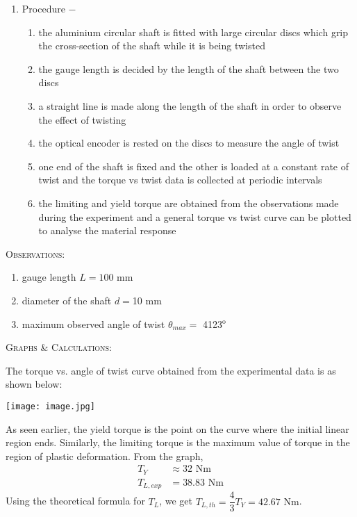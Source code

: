 \documentclass[a4paper, 11pt]{article}
\begin{document}
\begin{enumerate}[label=(\alph*)]
	\item {Procedure} $-$ 
	\begin{enumerate}[label=\roman*)]
		\item the aluminium circular shaft is fitted with large circular discs which grip the cross-section of the shaft while it is being twisted
		\item the gauge length is decided by the length of the shaft between the two discs
		\item a straight line is made along the length of the shaft in order to observe the effect of twisting
		\item the optical encoder is rested on the discs to measure the angle of twist
		\item one end of the shaft is fixed and the other is loaded at a constant rate of twist and the torque vs twist data is collected at periodic intervals
		\item the limiting and yield torque are obtained from the observations made during the experiment and a general torque vs twist curve can be plotted to analyse the material response
	\end{enumerate}
\end{enumerate}
\newpage
\textsc{Observations:}
\vspace{-2mm}

\begin{enumerate}[label=(\alph*)]
	\itemsep0em
	\item gauge length $L=100$ mm
	\item diameter of the shaft $d=$10 mm
	\item maximum observed angle of twist $\theta_{max}=$ 4123$^{\text{o}}$
\end{enumerate}

\textsc{Graphs \& Calculations:}
\vspace{2.5mm}

The torque vs. angle of twist curve obtained from the experimental data is as shown below:
\begin{center}
\texttt{[image: image.jpg]}
\end{center}
As seen earlier, the yield torque is the point on the curve where the initial linear region ends. Similarly, the limiting torque is the maximum value of torque in the region of plastic deformation. From the graph,
\begin{align*}
T_Y&\approx 32\text{ Nm}\\
T_{L,exp}&=38.83\text{ Nm}
\end{align*}
Using the theoretical formula for $T_L$, we get
$T_{L,th}=\dfrac{4}{3}T_Y=42.67\text{ Nm}$. 
\vspace{2.5mm}
\end{document}
